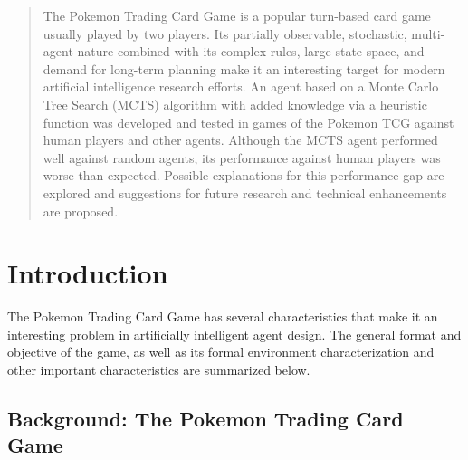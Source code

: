 \documentclass{article}
\begin{document}
 

\begin{abstract} %

The Pokemon Trading Card Game is a popular turn-based card game usually played by two players. Its partially observable, stochastic, multi-agent nature combined with its complex rules, large state space, and demand for long-term planning make it an interesting target for modern artificial intelligence research efforts. An agent based on a Monte Carlo Tree Search (MCTS) algorithm with added knowledge via a heuristic function was developed and tested in games of the Pokemon TCG against human players and other agents. Although the MCTS agent performed well against random agents, its performance against human players was  worse than expected. Possible explanations for this performance gap are explored and suggestions for future research and technical enhancements are proposed.

\end{abstract} 

\section{Introduction} %
The Pokemon Trading Card Game has several characteristics that make it an interesting problem in artificially intelligent agent design. The general format and objective of the game, as well as its formal environment characterization and other important characteristics are summarized below.

\subsection{Background: The Pokemon Trading Card Game} %
\end{document}
